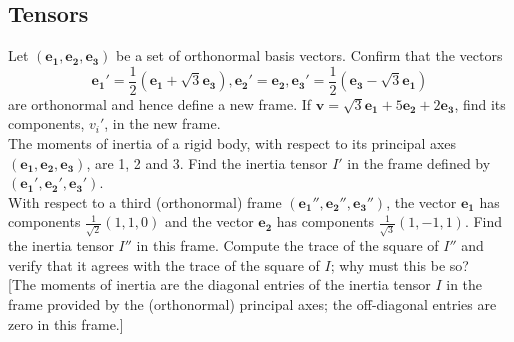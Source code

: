 \documentclass[a4paper]{article}
\begin{document}
\subsection*{Tensors}
\begin{qns}
Let $(\mathbf{e_1},\mathbf{e_2},\mathbf{e_3})$ be a set of orthonormal basis vectors. Confirm that the vectors 
$$\mathbf{e_1'}=\frac{1}{2}(\mathbf{e_1}+\sqrt{3}\mathbf{e_3}),\mathbf{e_2'}=\mathbf{e_2},\mathbf{e_3'}=\frac{1}{2}(\mathbf{e_3}-\sqrt{3}\mathbf{e_1})$$
are orthonormal and hence define a new frame. If $\mathbf{v}=\sqrt{3}\mathbf{e_1}+5\mathbf{e_2}+2\mathbf{e_3}$, find its components, $v_i'$, in the new frame.\\[5pt]
The moments of inertia of a rigid body, with respect to its principal axes $(\mathbf{e_1},\mathbf{e_2},\mathbf{e_3})$, are 1, 2 and 3. Find the inertia tensor $I'$ in the frame defined by $(\mathbf{e_1'},\mathbf{e_2'},\mathbf{e_3'})$.\\[5pt]
With respect to a third (orthonormal) frame $(\mathbf{e_1''},\mathbf{e_2''},\mathbf{e_3''})$, the vector $\mathbf{e_1}$ has components $\frac{1}{\sqrt{2}}(1,1,0)$ and the vector $\mathbf{e_2}$ has components $\frac{1}{\sqrt{3}}(1,-1,1)$.  Find the inertia tensor $I''$ in this frame. Compute the trace of the square of $I''$ and verify that it agrees with the trace of the square of $I$; why must this be so?\\[5pt]
[The moments of inertia are the diagonal entries of the inertia tensor $I$ in the frame provided by the (orthonormal) principal axes; the off-diagonal entries are zero in this frame.]
\end{qns}
\end{document}
